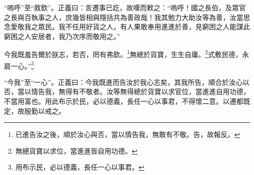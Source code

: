 {\noindent\shu{}\fzkt “嗚呼”至“敘欽”。正義曰：言遷事已訖，故嘆而敕之：“嗚呼！國之長伯，及眾官之長與百執事之人，庶幾皆相與隱括共為善政哉！我其勉力大助汝等為善，汝當思念愛敬我之眾民。我不任用好貨之人，有人果敢奉用進進於善，見窮困之人能謀此窮困之人安居者，我乃次序而敬用之。” \par}

今我既羞告爾於朕志，若否，罔有弗欽。\footnote{已進告汝之後，順於汝心與否，當以情告我，無敢有不敬。告，故報反。}無總於貨寶，生生自庸。\footnote{無總貨寶以求位，當進進皆自用功德。}式敷民德，永肩一心。”\footnote{用布示民，必以德義，長任一心以事君。}

{\noindent\shu{}\fzkt “今我”至“一心”。正義曰：今我既進而告汝於我心志矣，其我所告，順合於汝心以否，當以情告我，無得有不敬者。汝等無得總於貨寶以求官位，當進進自用功德，不當用富也。用此布示於民，必以德義，長任一心以事君，不得懷二意。以遷都既定，故殷勤以戒之。 \par}

